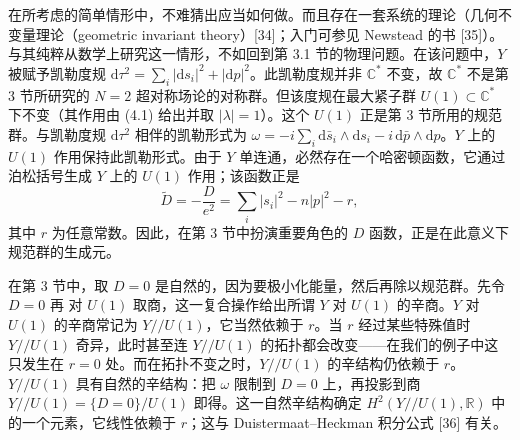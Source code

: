 在所考虑的简单情形中，不难猜出应当如何做。而且存在一套系统的理论（几何不变量理论（geometric invariant theory）[34]；入门可参见 Newstead 的书 [35]）。与其纯粹从数学上研究这一情形，不如回到第 3.1 节的物理问题。在该问题中，$Y$ 被赋予凯勒度规 $\mathrm{d}\tau^2=\sum_i|\mathrm{d}s_i|^2+|\mathrm{d}p|^2$。此凯勒度规并非 $\mathbb{C}^*$ 不变，故 $\mathbb{C}^*$ 不是第 3 节所研究的 $N=2$ 超对称场论的对称群。但该度规在最大紧子群 $U(1)\subset\mathbb{C}^*$ 下不变（其作用由 (4.1) 给出并取 $|\lambda|=1$）。这个 $U(1)$ 正是第 3 节所用的规范群。与凯勒度规 $\mathrm{d}\tau^2$ 相伴的凯勒形式为 $\omega=-i\sum_i\mathrm{d}\bar{s}_i\wedge\mathrm{d}s_i-i\,\mathrm{d}\bar{p}\wedge\mathrm{d}p$。$Y$ 上的 $U(1)$ 作用保持此凯勒形式。由于 $Y$ 单连通，必然存在一个哈密顿函数，它通过泊松括号生成 $Y$ 上的 $U(1)$ 作用；该函数正是
\begin{equation}
\tilde{D}=-\frac{D}{e^2}=\sum_i|s_i|^2-n|p|^2-r,
\tag{4.2}
\end{equation}
其中 $r$ 为任意常数。因此，在第 3 节中扮演重要角色的 $D$ 函数，正是在此意义下规范群的生成元。


在第 3 节中，取 $D=0$ 是自然的，因为要极小化能量，然后再除以规范群。先令 $D=0$ 再
\label{op:46}
对 $U(1)$ 取商，这一复合操作给出所谓 $Y$ 对 $U(1)$ 的辛商。$Y$ 对 $U(1)$ 的辛商常记为 $Y//U(1)$，它当然依赖于 $r$。当 $r$ 经过某些特殊值时 $Y//U(1)$ 奇异，此时甚至连 $Y//U(1)$ 的拓扑都会改变——在我们的例子中这只发生在 $r=0$ 处。而在拓扑不变之时，$Y//U(1)$ 的辛结构仍依赖于 $r$。$Y//U(1)$ 具有自然的辛结构：把 $\omega$ 限制到 $D=0$ 上，再投影到商 $Y//U(1)=\{D=0\}/U(1)$ 即得。这一自然辛结构确定 $H^2(Y//U(1),\mathbb{R})$ 中的一个元素，它线性依赖于 $r$；这与 Duistermaat--Heckman 积分公式 [36] 有关。


